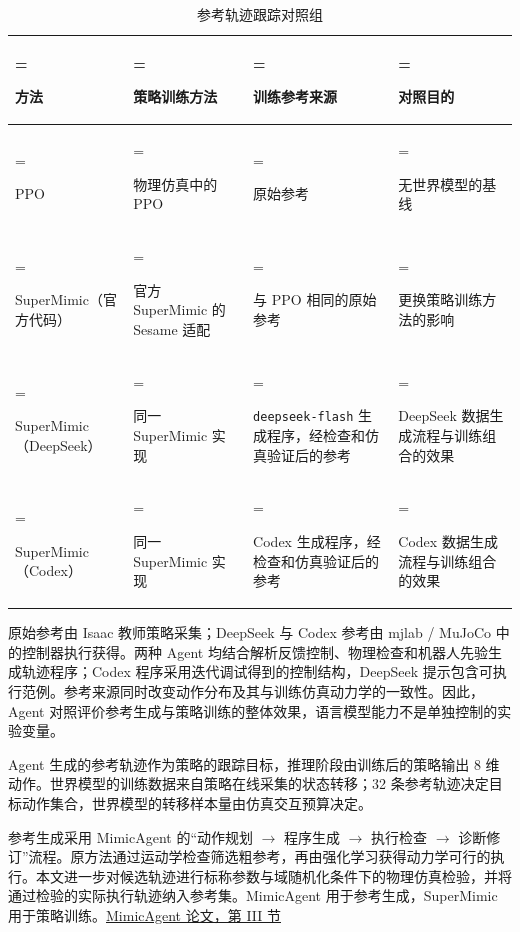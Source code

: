 \documentclass[UTF8,a4paper,zihao=5,fontset=fandol]{ctexart}
\begin{document}
\begin{table}[!htbp]
\centering
\caption{参考轨迹跟踪对照组}
\label{tab:results-5}
\begingroup
\fontsize{8.4}{11.2}\selectfont
\setlength{\tabcolsep}{3pt}
\renewcommand{\arraystretch}{1.20}
\begin{tabularx}{\linewidth}{@{}>{\hsize=0.920000\hsize\linewidth=\hsize\raggedright\arraybackslash}X>{\hsize=0.960000\hsize\linewidth=\hsize\raggedright\arraybackslash}X>{\hsize=1.080000\hsize\linewidth=\hsize\raggedright\arraybackslash}X>{\hsize=1.040000\hsize\linewidth=\hsize\raggedright\arraybackslash}X@{}}
\toprule
\textbf{方法} & \textbf{策略训练方法} & \textbf{训练参考来源} & \textbf{对照目的} \\
\midrule
PPO & 物理仿真中的 PPO & 原始参考 & 无世界模型的基线 \\
SuperMimic（官方代码） & 官方 SuperMimic 的 Sesame 适配 & 与 PPO 相同的原始参考 & 更换策略训练方法的影响 \\
SuperMimic（DeepSeek） & 同一 SuperMimic 实现 & \nolinkurl{deepseek-flash} 生成程序，经检查和仿真验证后的参考 & DeepSeek 数据生成流程与训练组合的效果 \\
SuperMimic（Codex） & 同一 SuperMimic 实现 & Codex 生成程序，经检查和仿真验证后的参考 & Codex 数据生成流程与训练组合的效果 \\
\bottomrule
\end{tabularx}
\endgroup
\end{table}
\FloatBarrier

原始参考由 Isaac 教师策略采集；DeepSeek 与 Codex 参考由 mjlab / MuJoCo 中的控制器执行获得。两种 Agent 均结合解析反馈控制、物理检查和机器人先验生成轨迹程序；Codex 程序采用迭代调试得到的控制结构，DeepSeek 提示包含可执行范例。参考来源同时改变动作分布及其与训练仿真动力学的一致性。因此，Agent 对照评价参考生成与策略训练的整体效果，语言模型能力不是单独控制的实验变量。

Agent 生成的参考轨迹作为策略的跟踪目标，推理阶段由训练后的策略输出 8 维动作。世界模型的训练数据来自策略在线采集的状态转移；32 条参考轨迹决定目标动作集合，世界模型的转移样本量由仿真交互预算决定。

参考生成采用 MimicAgent 的“动作规划 \(\rightarrow\) 程序生成 \(\rightarrow\) 执行检查 \(\rightarrow\) 诊断修订”流程。原方法通过运动学检查筛选粗参考，再由强化学习获得动力学可行的执行。本文进一步对候选轨迹进行标称参数与域随机化条件下的物理仿真检验，并将通过检验的实际执行轨迹纳入参考集。MimicAgent 用于参考生成，SuperMimic 用于策略训练。\href{https://arxiv.org/html/2609.24145v1\#S3}{MimicAgent 论文，第 III 节}
\end{document}
